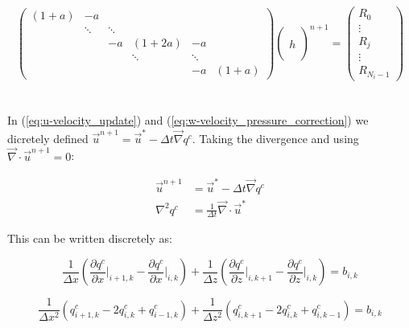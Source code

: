 \documentclass[12pt]{article}
\begin{document}
\begin{equation*}
\begin{pmatrix} 
(1 + a) & -a 
\\  & \ddots & \ddots 
\\ & & -a & (1 + 2a) & -a
\\ & & & \ddots & \ddots
\\ & & & & -a & (1 + a)
\end{pmatrix} \begin{pmatrix} ~\\~ \\ h \\ ~\\~ \end{pmatrix}^{n+1} = \begin{pmatrix} R_0 \\ \vdots \\ R_j \\ \vdots \\ R_{N_i-1} \end{pmatrix}
\end{equation*}

\section{}

In (\ref{eq:u-velocity_update}) and (\ref{eq:w-velocity_pressure_correction}) we dicretely defined $\vec{u}^{n+1} = \vec{u}^* - \Delta t \vec{\nabla} q^c$. Taking the divergence and using $\vec{\nabla} \cdot \vec{u}^{n+1} = 0$:

\begin{align*}
\vec{u}^{n+1} &= \vec{u}^* - \Delta t \vec{\nabla} q^c
\\
\nabla^2 q^c &= \frac{1}{\Delta t} \vec{\nabla} \cdot \vec{u}^*
\end{align*}

This can be written discretely as:

\begin{equation} \label{eq:poisson_with_derivatives}
\frac{1}{\Delta x} \left( \frac{\partial q^c}{\partial x} \bigg|_{i+1,k} - \frac{\partial q^c}{\partial x} \bigg|_{i,k} \right) 
+ \frac{1}{\Delta z} \left( \frac{\partial q^c}{\partial z} \bigg|_{i,k+1} - \frac{\partial q^c}{\partial z} \bigg|_{i,k} \right) = b_{i,k}
\end{equation}

\begin{equation} \label{eq:discrete_poisson}
\frac{1}{\Delta x^2} (q_{i+1,k}^c - 2 q_{i,k}^c + q_{i-1,k}^c) 
+ \frac{1}{\Delta z^2} (q_{i,k+1}^c- 2 q_{i,k}^c + q_{i,k-1}^c) = b_{i,k}
\end{equation}
\end{document}
